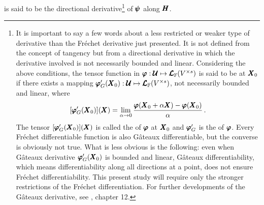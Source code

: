 is said to be the directional derivative\footnote{It is important to say a few words about a less restricted or weaker type of derivative than the Fr\'echet derivative just presented. It is not defined from the concept of tangency but from a directional derivative in which the derivative involved is not necessarily bounded and linear. Considering the above conditions, the tensor function in $\pmb{\varphi} : \pmb{\mathcal{U}} \mapsto \pmb{\mathcal{L}}_{\mathbb{F}}(V^{\times s})$ is said to be  at $\pmb{X}_0$ if there exists a mapping $\pmb{\varphi}'_G(\pmb{X}_0) : \pmb{\mathcal{U}} \mapsto \pmb{\mathcal{L}}_{\mathbb{F}}(V^{\times s})$, not necessarily bounded and linear, where
\begin{equation*}
[\pmb{\varphi}'_G(\pmb{X}_0)](\pmb{X})=\lim_{\alpha\to 0} \dfrac{\pmb{\varphi}(\pmb{X}_0+\alpha\pmb{X})-\pmb{\varphi}(\pmb{X}_0)}{\alpha}\,.
\end{equation*}
The tensor $[\pmb{\varphi}'_G(\pmb{X}_0)](\pmb{X})$ is called the  of $\pmb{\varphi}$ at $\pmb{X}_0$ and $\pmb{\varphi}'_G$ is the  of $\pmb{\varphi}$. Every Fr\'echet differentiable function is also G\^ateaux differentiable, but the converse is obviously not true. What is less obvious is the following: even when G\^ateaux derivative $\pmb{\varphi}'_G(\pmb{X}_0)$ is bounded and linear, G\^ateaux differentiability, which means differentiability along all directions at a point, does not ensure Fr\'echet differentiability. This present study will require only the stronger restrictions of the Fr\'echet differentiation. For further developments of the G\^ateaux derivative, see \cite{wouk_1979_1}, chapter 12.} of $\pmb{\psi}$ along $\pmb{H}$. 

